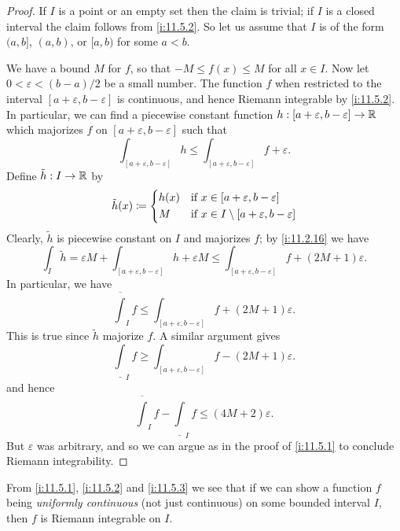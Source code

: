 \begin{proof}
  If \(I\) is a point or an empty set then the claim is trivial;
  if \(I\) is a closed interval the claim follows from \cref{i:11.5.2}.
  So let us assume that \(I\) is of the form \((a, b]\), \((a, b)\), or \([a, b)\) for some \(a < b\).

  We have a bound \(M\) for \(f\), so that \(-M \leq f(x) \leq M\) for all \(x \in I\).
  Now let \(0 < \varepsilon < (b - a) / 2\) be a small number.
  The function \(f\) when restricted to the interval \([a + \varepsilon, b - \varepsilon]\) is continuous, and hence Riemann integrable by \cref{i:11.5.2}.
  In particular, we can find a piecewise constant function \(h : [a + \varepsilon, b - \varepsilon] \to \mathbb{R}\) which majorizes \(f\) on \([a + \varepsilon, b - \varepsilon]\) such that
  \[
    \int_{[a + \varepsilon, b - \varepsilon]} h \leq \int_{[a + \varepsilon, b - \varepsilon]} f + \varepsilon.
  \]
  Define \(\tilde{h} : I \to \mathbb{R}\) by
  \[
    \tilde{h}(x) \coloneqq \begin{dcases}
      h(x) & \text{if } x \in [a + \varepsilon, b - \varepsilon]             \\
      M    & \text{if } x \in I \setminus [a + \varepsilon, b - \varepsilon]
    \end{dcases}
  \]
  Clearly, \(\tilde{h}\) is piecewise constant on \(I\) and majorizes \(f\);
  by \cref{i:11.2.16} we have
  \[
    \int_I \tilde{h} = \varepsilon M + \int_{[a + \varepsilon, b - \varepsilon]} h + \varepsilon M \leq \int_{[a + \varepsilon, b - \varepsilon]} f + (2M + 1) \varepsilon.
  \]
  In particular, we have
  \[
    \overline{\int}_I f \leq \int_{[a + \varepsilon, b - \varepsilon]} f + (2M + 1) \varepsilon.
  \]
  This is true since \(\tilde{h}\) majorize \(f\).
  A similar argument gives
  \[
    \underline{\int}_I f \geq \int_{[a + \varepsilon, b - \varepsilon]} f - (2M + 1) \varepsilon.
  \]
  and hence
  \[
    \overline{\int}_I f - \underline{\int}_I f \leq (4M + 2) \varepsilon.
  \]
  But \(\varepsilon\) was arbitrary, and so we can argue as in the proof of \cref{i:11.5.1} to conclude Riemann integrability.
\end{proof}

\begin{note}
  From \cref{i:11.5.1}, \cref{i:11.5.2} and \cref{i:11.5.3} we see that if we can show a function \(f\) being \emph{uniformly continuous} (not just continuous) on some bounded interval \(I\), then \(f\) is Riemann integrable on \(I\).
\end{note}

